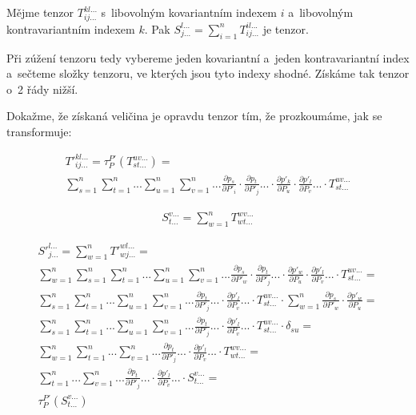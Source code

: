 \documentclass{book}
\begin{document}
\begin{fact}
Mějme tenzor \(T_{ij...}^{kl...}\) s~libovolným kovariantním indexem \(i\) a~libovolným kontravariantním indexem \(k\). Pak \(S_{j...}^{l...} = \sum_{i=1}^n T_{ij...}^{il...}\) je tenzor.
\end{fact}

Při zúžení tenzoru tedy vybereme jeden kovariantní a~jeden kontravariantní index a~sečteme složky tenzoru, ve kterých jsou tyto indexy shodné. Získáme tak tenzor o~2 řády nižší.

Dokažme, že získaná veličina je opravdu tenzor tím, že prozkoumáme, jak se transformuje:

\begin{equation}
\begin{split}
T'^{kl...}_{ij...} = \tau_P^{P'} (T_{st...}^{uv...}) = \\
\sum_{s=1}^n \sum_{t=1}^n ... \sum_{u=1}^n \sum_{v=1}^n ... \frac{\partial p_s}{\partial P'_i} \cdot \frac{\partial p_t}{\partial P'_j} ... \cdot \frac{\partial p'_k}{\partial P_u} \cdot \frac{\partial p'_l}{\partial P_v} ... \cdot T_{st...}^{uv...}
\end{split}
\end{equation}

\begin{equation}
\begin{split}
S_{t...}^{v...} = \sum_{w=1}^n T_{wt...}^{wv...}
\end{split}
\end{equation}

\begin{equation}
\begin{split}
S'^{l...}_{j...} = \sum_{w=1}^n T'^{wl...}_{wj...} = \\
\sum_{w=1}^n \sum_{s=1}^n \sum_{t=1}^n ... \sum_{u=1}^n \sum_{v=1}^n ... \frac{\partial p_s}{\partial P'_w} \cdot \frac{\partial p_t}{\partial P'_j} ... \cdot \frac{\partial p'_w}{\partial P_u} \cdot \frac{\partial p'_l}{\partial P_v} ... \cdot T_{st...}^{uv...} = \\
\sum_{s=1}^n \sum_{t=1}^n ... \sum_{u=1}^n \sum_{v=1}^n ... \frac{\partial p_t}{\partial P'_j} ... \cdot \frac{\partial p'_l}{\partial P_v} ... \cdot T_{st...}^{uv...} \cdot \sum_{w=1}^n \frac{\partial p_s}{\partial P'_w} \cdot \frac{\partial p'_w}{\partial P_u} = \\
\sum_{s=1}^n \sum_{t=1}^n ... \sum_{u=1}^n \sum_{v=1}^n ... \frac{\partial p_t}{\partial P'_j} ... \cdot \frac{\partial p'_l}{\partial P_v} ... \cdot T_{st...}^{uv...} \cdot \delta_{su} = \\
\sum_{w=1}^n \sum_{t=1}^n ... \sum_{v=1}^n ... \frac{\partial p_t}{\partial P'_j} ... \cdot \frac{\partial p'_l}{\partial P_v} ... \cdot T_{wt...}^{wv...} = \\
\sum_{t=1}^n ... \sum_{v=1}^n ... \frac{\partial p_t}{\partial P'_j} ... \cdot \frac{\partial p'_l}{\partial P_v} ... \cdot S_{t...}^{v...} = \\
\tau_P^{P'} (S_{t...}^{v...})
\end{split}
\end{equation}
\end{document}
